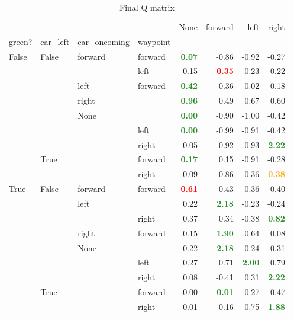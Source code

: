 \documentclass[conference]{IEEEtran}
\begin{document}
\begin{table}
\begin{tabular}{llllrrrr}
\hline
      &       &         &         &  None &  forward &  left &  right \\
green? & car\_left & car\_oncoming & waypoint &       &          &       &        \\
\hline
False & False & forward & forward &  \textcolor{ForestGreen}{\textbf{0.07}} &    -0.86 & -0.92 &  -0.27 \\
      &       &         & left &  0.15 &     \textcolor{red}{\textbf{0.35}} &  0.23 &  -0.22 \\
      &       & left & forward &  \textcolor{ForestGreen}{\textbf{0.42}} &     0.36 &  0.02 &   0.18 \\
      &       & right &         &  \textcolor{ForestGreen}{\textbf{0.96}} &     0.49 &  0.67 &   0.60 \\
      &       & None &         &  \textcolor{ForestGreen}{\textbf{0.00}} &    -0.90 & -1.00 &  -0.42 \\
      &       &         & left &  \textcolor{ForestGreen}{\textbf{0.00}} &    -0.99 & -0.91 &  -0.42 \\
      &       &         & right &  0.05 &    -0.92 & -0.93 &   \textcolor{ForestGreen}{\textbf{2.22}} \\
      & True  &         & forward &  \textcolor{ForestGreen}{\textbf{0.17}} &     0.15 & -0.91 &  -0.28 \\
      &       &         & right &  0.09 &    -0.86 &  0.36 &   \textcolor{Orange}{\textbf{0.38}} \\
True  & False & forward & forward &  \textcolor{red}{\textbf{0.61}} &     0.43 &  0.36 &  -0.40 \\
      &       & left &         &  0.22 &     \textcolor{ForestGreen}{\textbf{2.18}} & -0.23 &  -0.24 \\
      &       &         & right &  0.37 &     0.34 & -0.38 &   \textcolor{ForestGreen}{\textbf{0.82}} \\
      &       & right & forward &  0.15 &    \textcolor{ForestGreen}{\textbf{1.90}} &  0.64 &   0.08 \\
      &       & None &         &  0.22 &     \textcolor{ForestGreen}{\textbf{2.18}} & -0.24 &   0.31 \\
      &       &         & left &  0.27 &     0.71 &  \textcolor{ForestGreen}{\textbf{2.00}} &   0.79 \\
      &       &         & right &  0.08 &    -0.41 &  0.31 &   \textcolor{ForestGreen}{\textbf{2.22}} \\
      & True  &         & forward &  0.00 &     \textcolor{ForestGreen}{\textbf{0.01}} & -0.27 &  -0.47 \\
      &       &         & right &  0.01 &     0.16 &  0.75 &   \textcolor{ForestGreen}{\textbf{1.88}} \\
\hline
\end{tabular}

\vspace{1em}
\caption{Final Q matrix}
\label{tab:q}
\end{table}
\end{document}
